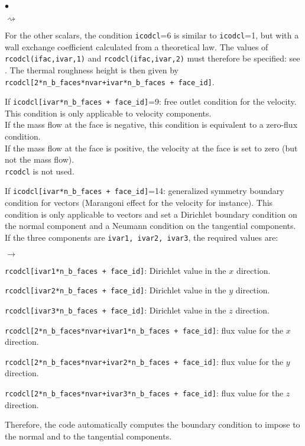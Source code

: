 \begin{list}{$\bullet$}{}
\begin{list}{$\rightsquigarrow$}{}
\item For the other scalars, the condition \texttt{icodcl}=6 is similar to
      \texttt{icodcl}=1, but with a wall exchange coefficient calculated from a
      theoretical law. The values of \texttt{rcodcl(ifac,ivar,1)} and
      \texttt{rcodcl(ifac,ivar,2)} must therefore be specified: see \cite{theory}.
      The thermal roughness height is then given by \texttt{rcodcl[2*n\_b\_faces*nvar+ivar*n\_b\_faces + face\_id]}.
\end{list}

\item If \texttt{icodcl[ivar*n\_b\_faces + face\_id]}=9: free outlet condition for the
      velocity. This condition is only applicable to velocity
      components.\\
      If the mass flow at the face is negative, this condition is equivalent
      to a zero-flux condition.\\
      If the mass flow at the face is positive, the velocity at the face is set to zero (but not the mass flow).\\
\texttt{rcodcl} is not used.

\item If \texttt{icodcl[ivar*n\_b\_faces + face\_id]}=14: generalized symmetry boundary condition for vectors (Marangoni
      effect for the velocity for instance).
      This condition is only applicable to vectors and set a Dirichlet boundary condition on the normal
      component and a Neumann condition on the tangential components.\\
      If the three components are  \texttt{ivar1, ivar2, ivar3}, the required values are:

\begin{list}{$\rightarrow$}{}
      \item \texttt{rcodcl[ivar1*n\_b\_faces + face\_id]}: Dirichlet value in the $x$ direction.
      \item \texttt{rcodcl[ivar2*n\_b\_faces + face\_id]}: Dirichlet value in the $y$ direction.
      \item \texttt{rcodcl[ivar3*n\_b\_faces + face\_id]}: Dirichlet value in the $z$ direction.
      \item \texttt{rcodcl[2*n\_b\_faces*nvar+ivar1*n\_b\_faces + face\_id]}: flux value for the $x$ direction.
      \item \texttt{rcodcl[2*n\_b\_faces*nvar+ivar2*n\_b\_faces + face\_id]}: flux value for the $y$ direction.
      \item \texttt{rcodcl[2*n\_b\_faces*nvar+ivar3*n\_b\_faces + face\_id]}: flux value for the $z$ direction.
\end{list}
      Therefore, the code automatically computes the boundary condition to impose to the normal and to
      the tangential components.

\end{list}

